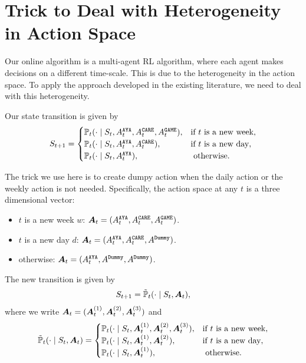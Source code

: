 \documentclass{article}
\def\AYA{{\texttt{AYA}}}
\def\EDGE{{\texttt{GAME}}}
\def\CARE{{\texttt{CARE}}}
\def\Dummy{{\texttt{Dummy}}}
\begin{document}
\newpage

\appendix

\section{Trick to Deal with Heterogeneity in Action Space} \label{sec:flatten}

Our online algorithm is a multi-agent RL algorithm, where each agent makes decisions on a different time-scale. This is due to the heterogeneity in the action space. To apply the approach developed in the existing literature, we need to deal with this heterogeneity.

Our state transition is given by
\begin{align*}
    S_{t+1} = \begin{cases}
        \sP_t(\cdot \mid S_t, A_t^{\AYA}, A_t^{\CARE}, A_t^{\EDGE}), & \text{if } t \text{ is a new week}, \\
        \sP_t(\cdot \mid S_t, A_t^{\AYA}, A_t^{\CARE}), & \text{if } t \text{ is a new day}, \\
        \sP_t(\cdot \mid S_t, A_t^{\AYA}), & \text{ otherwise}.
    \end{cases}
\end{align*}

The trick we use here is to create dumpy action when the daily action or the weekly action is not needed. Specifically, the action space at any $t$ is a three dimensional vector:
\begin{itemize}
    \item $t$ is a new week $w$: $\mA_t = (A_t^{\AYA}, A_{t}^{\CARE}, A_{t}^{\EDGE})$.
    \item $t$ is a new day $d$: $\mA_t = (A_{t}^{\AYA}, A_{t}^{\CARE}, A^{\Dummy})$.
    \item otherwise: $\mA_t = (A_{t}^{\AYA}, A^{\Dummy}, A^{\Dummy})$.
\end{itemize}

The new transition is given by
\begin{align*}
    S_{t+1} = \tilde{{\mathbb{P}}}_t(\cdot \mid S_t, {\bm{A}}_t),
\end{align*}
where we write ${\bm{A}}_t = ({\bm{A}}_t^{(1)}, {\bm{A}}_t^{(2)}, {\bm{A}}_t^{(3)})$ and
\begin{align*}
    \tilde{{\mathbb{P}}}_t(\cdot \mid S_t, {\bm{A}}_t) = \begin{cases}
        {\mathbb{P}}_t(\cdot \mid S_t, {\bm{A}}_t^{(1)}, {\bm{A}}_t^{(2)}, {\bm{A}}_t^{(3)}), & \text{if } t \text{ is a new week}, \\
        {\mathbb{P}}_t(\cdot \mid S_t, {\bm{A}}_t^{(1)}, {\bm{A}}_t^{(2)}), & \text{if } t \text{ is a new day}, \\
        {\mathbb{P}}_t(\cdot \mid S_t, {\bm{A}}_t^{(1)}), & \text{ otherwise}.
    \end{cases}
\end{align*}
\end{document}
